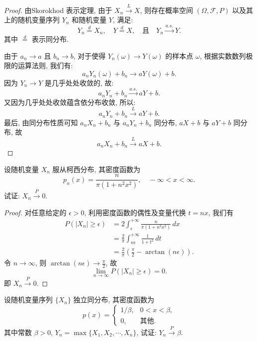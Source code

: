 \documentclass[../main.tex]{subfiles}
\begin{document}
\begin{proof}
  由Skorokhod 表示定理, 由于 \(X_n \xrightarrow{L} X\), 则存在概率空间 \((\Omega, \mathcal{F}, P)\) 以及其上的随机变量序列 \(Y_n\) 和随机变量 \(Y\), 满足:
\[
Y_n \stackrel{d}{=} X_n, \quad Y \stackrel{d}{=} X, \quad \text{且} \quad Y_n \xrightarrow{a.s.} Y.
\]
其中 \(\stackrel{d}{=}\) 表示同分布.

由于 \(a_n \to a\) 且 \(b_n \to b\), 对于使得 \(Y_n(\omega) \to Y(\omega)\) 的样本点 \(\omega\), 根据实数数列极限的运算法则, 我们有:
\[
a_n Y_n(\omega) + b_n \to a Y(\omega) + b.
\]
因为 \(Y_n \to Y\) 是几乎处处收敛的, 故:
\[
a_n Y_n + b_n \xrightarrow{a.s.} a Y + b.
\]
又因为几乎处处收敛蕴含依分布收敛, 所以:
\[
a_n Y_n + b_n \xrightarrow{L} a Y + b.
\]
最后, 由同分布性质可知 \(a_n X_n + b_n\) 与 \(a_n Y_n + b_n\) 同分布, \(aX+b\) 与 \(aY+b\) 同分布, 故
\[
a_n X_n + b_n \xrightarrow{L} aX + b.
\]

\end{proof}
\begin{exercise}{}{}
设随机变量 $X_n$ 服从柯西分布, 其密度函数为
\[ p_n(x) = \frac{n}{\pi(1+n^2x^2)}, \quad -\infty < x < \infty. \]
试证: $X_n \xrightarrow{P} 0.$
\end{exercise}

\begin{proof}
  对任意给定的 \(\epsilon > 0\), 利用密度函数的偶性及变量代换 \(t=nx\), 我们有
\[
\begin{aligned}
P(|X_n| \ge \epsilon) &= 2 \int_{\epsilon}^{+\infty} \frac{n}{\pi(1+n^2x^2)} \, dx \\
&= \frac{2}{\pi} \int_{n\epsilon}^{+\infty} \frac{1}{1+t^2} \, dt \\
&= \frac{2}{\pi} \left( \frac{\pi}{2} - \arctan(n\epsilon) \right).
\end{aligned}
\]
令 \(n \to \infty\), 则 \(\arctan(n\epsilon) \to \frac{\pi}{2}\), 故
\[ \lim_{n \to \infty} P(|X_n| \ge \epsilon) = 0. \]
即 \(X_n \xrightarrow{P} 0\).
\end{proof}

\begin{exercise}{}{}
设随机变量序列 $\{X_n\}$ 独立同分布, 其密度函数为
\[ p(x) = \begin{cases} 1/\beta, & 0 < x < \beta, \\ 0, & \text{其他}. \end{cases} \]
其中常数 $\beta > 0$, $Y_n = \operatorname{max}\{X_1, X_2, \cdots, X_n\}$, 试证: $Y_n \xrightarrow{P} \beta.$
\end{exercise}
\end{document}
